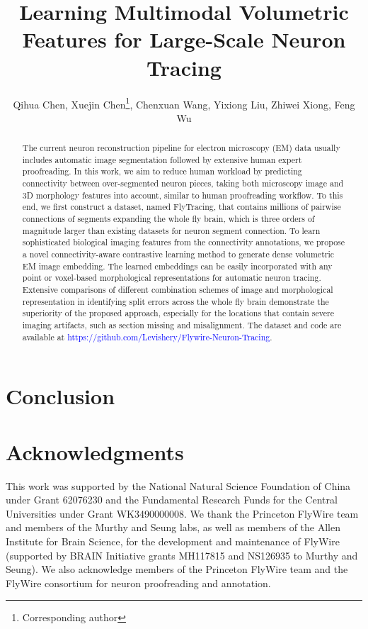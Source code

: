 \documentclass[letterpaper]{article} %
\title{Learning Multimodal Volumetric Features for Large-Scale Neuron Tracing}
\author {
    Qihua Chen,
    Xuejin Chen\thanks{ Corresponding author},
    Chenxuan Wang, 
    Yixiong Liu, 
    Zhiwei Xiong, 
    Feng Wu
}
\begin{document}
\maketitle

\begin{abstract}
The current neuron reconstruction pipeline for electron microscopy (EM) data usually includes automatic image segmentation followed by extensive human expert proofreading. In this work, we aim to reduce human workload by predicting connectivity between over-segmented neuron pieces, taking both microscopy image and 3D morphology features into account, similar to human proofreading workflow. 
To this end, we first construct a dataset, named FlyTracing, that contains millions of pairwise connections of segments expanding the whole fly brain, which is three orders of magnitude larger than existing datasets for neuron segment connection. 
%
To learn sophisticated biological imaging features from the connectivity annotations, we propose a novel connectivity-aware contrastive learning method to generate dense volumetric EM image embedding. The learned embeddings can be easily incorporated with any point or voxel-based morphological representations for automatic neuron tracing.
Extensive comparisons of different combination schemes of image and morphological representation in identifying split errors across the whole fly brain demonstrate the superiority of the proposed approach, especially for the locations that contain severe imaging artifacts, such as section missing and misalignment. The dataset and code are available at \textcolor{blue}{https://github.com/Levishery/Flywire-Neuron-Tracing}.
\end{abstract}


 

 



\section{Conclusion}


\section*{Acknowledgments}
This work was supported by the National Natural Science Foundation of China under Grant 62076230 and the Fundamental Research Funds for the Central Universities under Grant WK3490000008. 
We thank the Princeton FlyWire team and members of the Murthy and Seung labs, as well as members of the Allen Institute for Brain Science, for the development and maintenance of FlyWire (supported by BRAIN Initiative grants MH117815 and NS126935 to Murthy and Seung). We also acknowledge members of the Princeton FlyWire team and the FlyWire consortium for neuron proofreading and annotation.

  

\end{document}
